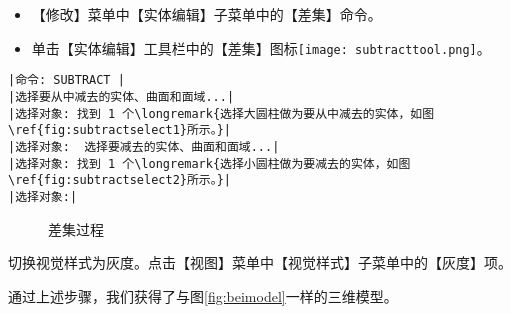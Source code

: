 \begin{procedure}
\begin{itemize}
\item 【修改】菜单中【实体编辑】子菜单中的【差集】命令。
\item 单击【实体编辑】工具栏中的【差集】图标\texttt{[image: subtracttool.png]}。
\end{itemize}
\begin{lstlisting}
|命令: SUBTRACT |
|选择要从中减去的实体、曲面和面域...|
|选择对象: 找到 1 个\longremark{选择大圆柱做为要从中减去的实体，如图\ref{fig:subtractselect1}所示。}|
|选择对象:  选择要减去的实体、曲面和面域...|
|选择对象: 找到 1 个\longremark{选择小圆柱做为要减去的实体，如图\ref{fig:subtractselect2}所示。}|
|选择对象:|
\end{lstlisting}
\begin{figure}[htbp]
\centering
{}\hspace{20pt}
\caption{差集过程}
\end{figure}
\showremarks
\item 切换视觉样式为灰度。点击【视图】菜单中【视觉样式】子菜单中的【灰度】项。
\end{procedure}

通过上述步骤，我们获得了与图\ref{fig:beimodel}一样的三维模型。
\endinput